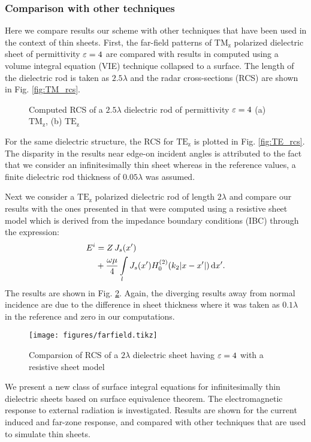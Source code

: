 \subsubsection{Comparison with other techniques}
%
Here we compare results our scheme with other techniques that have been used in the context of thin sheets. First, the far-field patterns of $\mathrm{TM_z}$ polarized dielectric sheet of permittivity $\varepsilon = 4$ are compared with results in \cite{Richmond1965} computed using a volume integral equation (VIE) technique collapsed to a surface. The length of the dielectric rod is taken as $2.5 \lambda$ and the radar cross-sections (RCS) are shown in Fig. \ref{fig:TM_rcs}.
%
\begin{figure}[!htbp]
  \centering
  \caption{Computed RCS of a $2.5 \lambda$ dielectric rod of permittivity $\varepsilon=4$ (a) $\mathrm{TM_z}$, (b) $\mathrm{TE_z}$}
  \label{fig:RCS_richmodn}
\end{figure}
%
For the same dielectric structure, the RCS for $\mathrm{TE_z}$ is plotted in Fig. \ref{fig:TE_rcs}. The disparity in the results near edge-on incident angles is attributed to the fact that we consider an infinitesimally thin sheet whereas in the reference values, a finite dielectric rod thickness of $0.05 \lambda$ was assumed.

Next we consider a $\mathrm{TE_z}$ polarized dielectric rod of length $2 \lambda$ and compare our results with the ones presented in \cite{Senior_1987} that were computed using a resistive sheet model which is derived from the impedance boundary conditions (IBC) through the expression:
%
\begin{equation}
  \begin{split}
    E^i &= Z \, J_s(x') \\
    & + \frac{\omega \mu}{4}  \int\limits_{l} J_s(x')  H_0^{(2)}(k_2 |x - x'|) \mathop{}\!\mathrm{d}{x'}.
  \end{split}
  \label{eq:IBC_senior}
\end{equation}
%
The results are shown in Fig. \ref{fig:senior_rcs}. Again, the diverging results away from normal incidence are due to the difference in sheet thickness where it was taken as $0.1 \lambda$ in the reference and zero in our computations.
%
\begin{figure}
  \centering
  \texttt{[image: figures/farfield.tikz]}
  \caption{Comparsion of RCS of a $2 \lambda$ dielectric sheet having $\varepsilon=4$ with a resistive sheet model}
  \label{fig:senior_rcs}
\end{figure}
%
%
%
We present a new class of surface integral equations for infinitesimally thin dielectric sheets based on surface equivalence theorem. The electromagnetic response to external radiation is investigated. Results are shown for the current induced and far-zone response, and compared with other techniques that are used to simulate thin sheets.

% 
% 
%
% 
